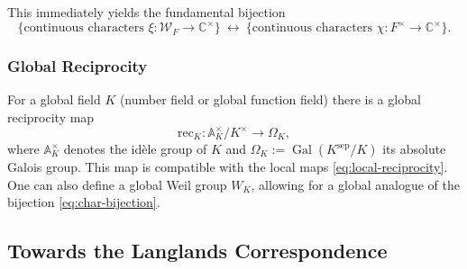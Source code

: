 \documentclass[11pt]{amsart}
\DeclareMathOperator{\Gal}{Gal}
\begin{document}
This immediately yields the fundamental bijection
\begin{equation} \label{eq:char-bijection}
\bigl\{\text{continuous characters } 
\xi: \mathcal{W}_F \to \mathbb{C}^\times\bigr\}
\ \longleftrightarrow \
\bigl\{\text{continuous characters } 
\chi: F^\times \to \mathbb{C}^\times\bigr\}.
\end{equation}

\subsubsection*{Global Reciprocity}

For a global field \(K\) (number field or global function field) there is a 
global reciprocity map
\begin{equation} \label{eq:global-reciprocity}
\mathrm{rec}_K : \mathbb{A}_K^\times / K^\times \longrightarrow \Omega_K,
\end{equation}
where \(\mathbb{A}_K^\times\) denotes the idèle group of \(K\) and 
\(\Omega_K := \Gal(K^{\mathrm{sep}}/K)\) its absolute Galois group.
This map is compatible with the local maps \eqref{eq:local-reciprocity}.
One can also define a global Weil group \(W_K\), allowing for a 
global analogue of the bijection \eqref{eq:char-bijection}.

\bigskip

\subsection{Towards the Langlands Correspondence}
\end{document}
